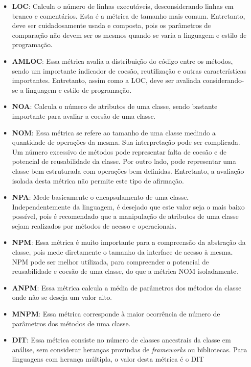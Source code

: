 \begin{itemize}
  \item \textbf{LOC}: Calcula o número de linhas executáveis, desconsiderando linhas 
    em branco e comentários. Esta é a métrica de tamanho mais comum. Entretanto, deve ser cuidadosamente usada e composta, pois
    os parâmetros de comparação não devem ser os mesmos quando se varia a linguagem e estilo de programação.
  \item \textbf{AMLOC}: Essa métrica avalia a distribuição
    do código entre os métodos, sendo um importante indicador de coesão, reutilização e outras características importantes. 
    Entretanto, assim como a LOC, deve ser avaliada considerando-se a linguagem e estilo de programação.
  \item \textbf{NOA}: Calcula o número de atributos de uma classe, sendo 
    bastante importante para avaliar a coesão de uma classe.
  \item \textbf{NOM}: Essa métrica se refere ao tamanho de uma classe medindo a 
    quantidade de operações da mesma. Sua interpretação pode ser complicada. Um número excessivo de métodos pode 
    representar falta de coesão e de potencial de reusabilidade da classe. Por outro lado, pode representar uma classe bem 
    estruturada com operações bem definidas. Entretanto, a avaliação isolada desta métrica não permite este tipo de afirmação.
  \item \textbf{NPA}: Mede basicamente o encapsulamento de uma classe.
    Independentemente da linguagem, é desejado que este valor 
    seja o mais baixo possível, pois é recomendado que a manipulação de atributos de uma classe sejam realizados por métodos de 
    acesso e operacionais.
  \item \textbf{NPM}: Essa métrica é muito importante para a compreensão da abstração da classe, pois mede diretamente o 
    tamanho da interface de acesso à mesma. NPM pode ser melhor utilizada, para compreender o potencial de reusabilidade e 
    coesão de uma classe, do que a métrica NOM isoladamente.
  \item \textbf{ANPM}: Essa métrica calcula a média de parâmetros dos métodos da classe onde não se deseja um valor alto.
  \item \textbf{MNPM}: Essa métrica corresponde à maior ocorrência de número de parâmetros dos métodos de uma classe.
  \item \textbf{DIT}: Essa métrica consiste no número de classes ancestrais da classe em análise, sem considerar heranças 
    provindas de \textit{frameworks} ou bibliotecas. Para linguagens com herança múltipla, o valor desta métrica é o DIT 

\end{itemize}
